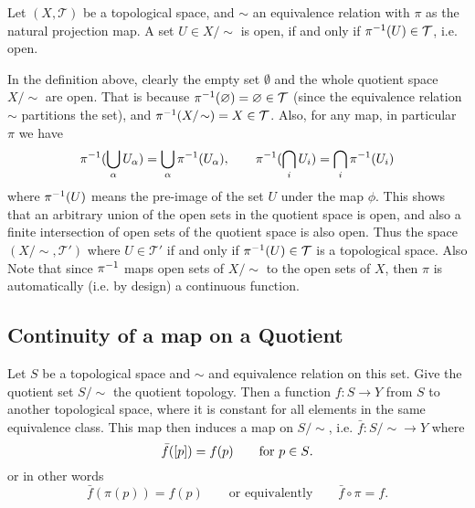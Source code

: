 \begin{definition}
	Let $ (X,\mathcal{T}) $ be a topological space, and $ \sim $ an equivalence relation with $ \pi $ as the natural projection map. A set $ U \in X/\sim $ is open, if and only if $ \pi^{-1}(U) \in \mathcal{T} $, i.e. open. 
\end{definition}
\begin{remark}
	In the definition above, clearly the empty set $ \emptyset $ and the whole quotient space $ X/\sim $ are open. That is because $ \pi^{-1}(\varnothing) = \varnothing \in \mathcal{T} $ (since the equivalence relation $ \sim $ partitions the set), and $ \inv{\pi}(X/\sim) = X \in \mathcal{T}  $. Also, for any map, in particular $ \pi $ we have
	\[ \pi^{-1}(\bigcup_\alpha U_\alpha) = \bigcup_\alpha \pi^{-1}(U_\alpha), \qquad \pi^{-1}(\bigcap_i U_i) = \bigcap_i \pi^{-1}(U_i) \]
	where $ \pi^{-1}(U) $ means the pre-image of the set $ U $ under the map $ \phi $. This shows that an arbitrary union of the open sets in the quotient space is open, and also a finite intersection of open sets of the quotient space is also open. Thus the space $ (X/\sim, \mathcal{T}') $ where $ U \in \mathcal{T}' $ if and only if $ \pi^{-1}(U) \in \mathcal{T} $ is a topological space.
	\newline 
	\noindent Also Note that since $ \pi^{-1} $ maps open sets of $ X/\!\sim $ to the open sets of $ X $, then $ \pi $ is automatically (i.e. by design) a continuous function.
\end{remark}

\subsection{Continuity of a map on a Quotient}

Let $ S $ be a topological space and $ \sim $ and equivalence relation on this set. Give the quotient set $ S/\sim $ the quotient topology. Then a function $ f:S\to Y $ from $ S $ to another topological space, where it is constant for all elements in the same equivalence class. This map then induces a map on $ S/\sim $, i.e. $ \bar{f}: S/\sim \to Y $ where
 \[ \bar{f}([p]) = f(p) \qquad \text{for $ p\in S $}. \] 
 or in other words
 \[ \bar{f}(\pi(p)) = f(p) \qquad \text{or equivalently} \qquad \bar{f}\circ\pi  = f. \]

